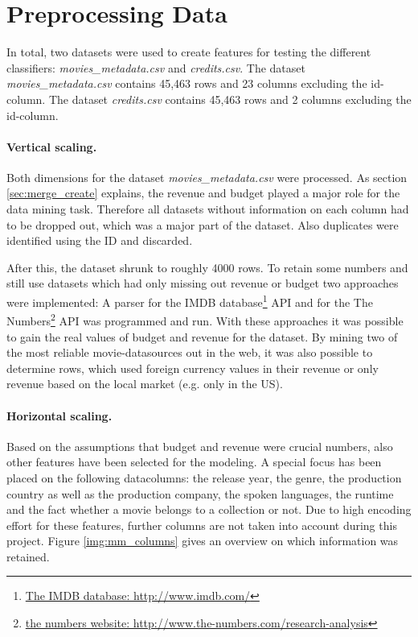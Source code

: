 \section{Preprocessing Data}
\label{cha:preprocessing}

In total, two datasets were used to create features for testing the different classifiers:
\textit{movies\_metadata.csv} and \textit{credits.csv}. The dataset \textit{movies\_metadata.csv} contains 45,463 rows and 23 columns excluding the id-column. The dataset \textit{credits.csv} contains 45,463 rows and 2 columns excluding the id-column.

\paragraph{Vertical scaling.}
Both dimensions for the dataset \textit{movies\_metadata.csv} were processed. As section \ref{sec:merge_create} explains, the revenue and budget played a major role for the data mining task. Therefore all datasets without information on each column had to be dropped out, which was a major part of the dataset. Also duplicates were identified using the ID and discarded. 
 
After this, the dataset shrunk to roughly 4000 rows. To retain some numbers and still use datasets which had only missing out revenue or budget two approaches were implemented: A parser for the IMDB database\footnote{
\hyperref{http://www.imdb.com/}{external_sources}{ref:IMDB}{The IMDB database: http://www.imdb.com/}} API and for the The Numbers\footnote{\hyperref{http://www.the-numbers.com/research-analysis}{external_sources}{ref:numbers}{the numbers website: http://www.the-numbers.com/research-analysis}} API was programmed and run. With these approaches it was possible to gain the real values of budget and revenue for the dataset. By mining two of the most reliable movie-datasources out in the web, it was also possible to determine rows, which used foreign currency values in their revenue or only revenue based on the local market (e.g. only in the US).

\paragraph{Horizontal scaling.}
Based on the assumptions that budget and revenue were crucial numbers, also other features have been selected for the modeling. A special focus has been placed on the following datacolumns: the release year, the genre, the production country as well as the production company, the spoken languages, the runtime and the fact whether a movie belongs to a collection or not. Due to high encoding effort for these features, further columns are not taken into account during this project. Figure \ref{img:mm_columns} gives an overview on which information was retained.

